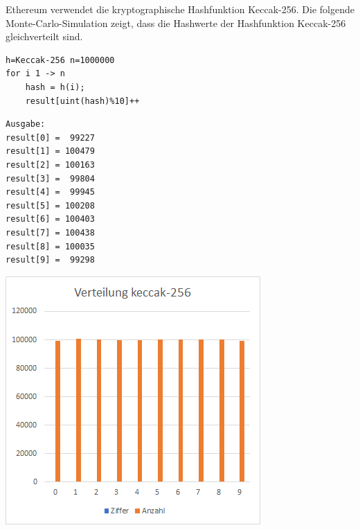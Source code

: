 Ethereum verwendet die kryptographische Hashfunktion Keccak-256.
Die folgende Monte-Carlo-Simulation zeigt, dass die Hashwerte der Hashfunktion Keccak-256 gleichverteilt sind.
\begin{verbatim}
h=Keccak-256 n=1000000
for i 1 -> n
    hash = h(i);
    result[uint(hash)%10]++
\end{verbatim}
\begin{minipage}{0.5\textwidth}
\begin{verbatim}
Ausgabe:
result[0] =  99227
result[1] = 100479
result[2] = 100163
result[3] =  99804
result[4] =  99945
result[5] = 100208
result[6] = 100403
result[7] = 100438
result[8] = 100035
result[9] =  99298
\end{verbatim}
\end{minipage}
\begin{minipage}{0.5\textwidth}
\includegraphics[width=\textwidth]{Figures/verteilung_keccak256}
\centering
\decoRule
{}
\label{fig:verteilung_keccak256}
\end{minipage}

